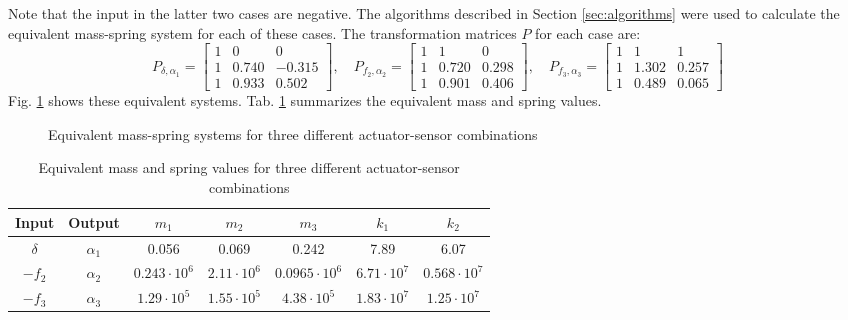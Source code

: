 \documentclass{mbd_fullpaper}
\begin{document}
Note that the input in the latter two cases are negative.
The algorithms described in Section \ref{sec:algorithms} were used to calculate the equivalent mass-spring system for each of these cases.
The transformation matrices $P$ for each case are:
\begin{equation}
P_{\delta,\alpha_1} = 
\begin{bmatrix} 1 & 0 & 0 \\
1 & 0.740 & -0.315 \\
1 & 0.933 & 0.502 \end{bmatrix}
, \quad
P_{f_2,\alpha_2} = 
\begin{bmatrix} 1 & 1 & 0 \\
1 & 0.720 & 0.298 \\
1 & 0.901 & 0.406 \end{bmatrix}
, \quad
P_{f_3,\alpha_3} = 
\begin{bmatrix} 1 & 1 & 1 \\
1 & 1.302 & 0.257 \\
1 & 0.489 & 0.065 \end{bmatrix}
\end{equation}
Fig. \ref{fig:rocket-trans} shows these equivalent systems. Tab. \ref{tab:equiv_vals} summarizes the equivalent mass and spring values.
\begin{figure}[h]
  \begin{center}
    
    \caption{Equivalent mass-spring systems for three different actuator-sensor combinations \label{fig:rocket-trans}}
  \end{center}
\end{figure}
\renewcommand{\arraystretch}{1.5}
\begin{table}[!ht]
  \begin{center}
    \caption{Equivalent mass and spring values for three different actuator-sensor combinations \label{tab:equiv_vals}}
    \vspace{1mm}
    \begin{tabular}{ ccccccc }
	\hline
           Input & Output & $m_1$ & $m_2$ & $m_3$ & $k_1$ & $k_2$ \\
	\hline
      	$\delta$ & $\alpha_1$ & 0.056 & 0.069 & 0.242 & 7.89 & 6.07  \\
      	$-f_2$ & $\alpha_2$ & $0.243\cdot 10^6$ & $2.11\cdot 10^6$ & $0.0965\cdot 10^6$ & $6.71\cdot 10^7$ & $0.568\cdot 10^7$ \\
      	$-f_3$ & $\alpha_3$ & $1.29\cdot 10^5$ & $1.55\cdot 10^5$ & $4.38\cdot 10^5$ & $1.83\cdot 10^7$ & $1.25\cdot 10^7$ \\
    \end{tabular}
  \end{center}
\end{table}
\end{document}
